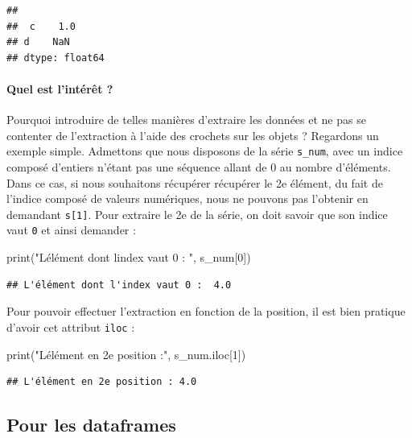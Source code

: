\documentclass[
  12pt,
]{book}
\newenvironment{Shaded}{\begin{snugshade}}{\end{snugshade}}
\newcommand{\BuiltInTok}[1]{#1}
\newcommand{\DecValTok}[1]{\textcolor[rgb]{0.00,0.00,0.81}{#1}}
\newcommand{\NormalTok}[1]{#1}
\newcommand{\StringTok}[1]{\textcolor[rgb]{0.31,0.60,0.02}{#1}}
\numberwithin{equation}{section}
\numberwithin{countremarque}{section}
\begin{document}
\begin{lstlisting}
## 
##  c    1.0
## d    NaN
## dtype: float64
\end{lstlisting}

\paragraph{Quel est l'intérêt ?}\label{quel-est-lintuxe9ruxeat}

Pourquoi introduire de telles manières d'extraire les données et ne pas se contenter de l'extraction à l'aide des crochets sur les objets ? Regardons un exemple simple. Admettons que nous disposons de la série \texttt{s\_num}, avec un indice composé d'entiers n'étant pas une séquence allant de 0 au nombre d'éléments. Dans ce cas, si nous souhaitons récupérer récupérer le 2e élément, du fait de l'indice composé de valeurs numériques, nous ne pouvons pas l'obtenir en demandant \texttt{s{[}1{]}}. Pour extraire le 2e de la série, on doit savoir que son indice vaut \texttt{0} et ainsi demander :

\begin{Shaded}
\begin{Highlighting}[]
\BuiltInTok{print}\NormalTok{(}\StringTok{"L\textquotesingle{}élément dont l\textquotesingle{}index vaut 0 : "}\NormalTok{, s\_num[}\DecValTok{0}\NormalTok{])}
\end{Highlighting}
\end{Shaded}

\begin{lstlisting}
## L'élément dont l'index vaut 0 :  4.0
\end{lstlisting}

Pour pouvoir effectuer l'extraction en fonction de la position, il est bien pratique d'avoir cet attribut \texttt{iloc} :

\begin{Shaded}
\begin{Highlighting}[]
\BuiltInTok{print}\NormalTok{(}\StringTok{"L\textquotesingle{}élément en 2e position :"}\NormalTok{, s\_num.iloc[}\DecValTok{1}\NormalTok{])}
\end{Highlighting}
\end{Shaded}

\begin{lstlisting}
## L'élément en 2e position : 4.0
\end{lstlisting}

\subsection{Pour les dataframes}\label{pour-les-dataframes}
\end{document}
